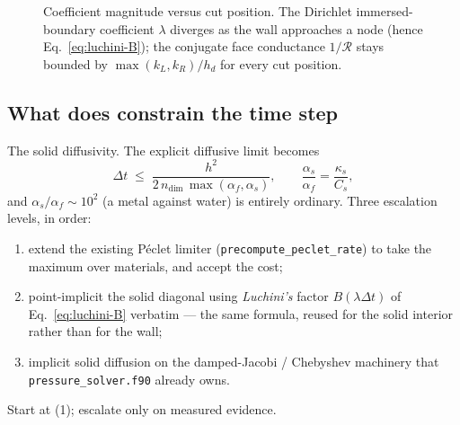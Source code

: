 \documentclass[11pt,a4paper]{article}
\newcommand{\Rser}{\mathcal{R}}
\newcommand{\code}[1]{\texttt{#1}}
\begin{document}
\begin{figure}[htbp]
\centering
{}
\caption{Coefficient magnitude versus cut position. The Dirichlet
immersed-boundary coefficient $\lambda$ diverges as the wall approaches a node
(hence Eq.~\eqref{eq:luchini-B}); the conjugate face conductance $1/\Rser$ stays
bounded by $\max(k_L,k_R)/h_d$ for every cut position.}
\label{fig:stiffness}
\end{figure}

\subsection{What does constrain the time step}

The solid diffusivity. The explicit diffusive limit becomes
\begin{equation}
  \Delta t \;\le\; \frac{h^{2}}{2\,n_{\text{dim}}\,\max(\alpha_f,\alpha_s)},
  \qquad \frac{\alpha_s}{\alpha_f}=\frac{\kappa_s}{C_s},
\end{equation}
and $\alpha_s/\alpha_f\sim10^{2}$ (a metal against water) is entirely ordinary.
Three escalation levels, in order:
\begin{enumerate}
\item extend the existing P\'eclet limiter
      (\code{precompute\_peclet\_rate}) to take the maximum over materials, and
      accept the cost;
\item point-implicit the solid diagonal using \emph{Luchini's} factor
      $B(\lambda\Delta t)$ of Eq.~\eqref{eq:luchini-B} verbatim --- the same
      formula, reused for the solid interior rather than for the wall;
\item implicit solid diffusion on the damped-Jacobi / Chebyshev machinery that
      \code{pressure\_solver.f90} already owns.
\end{enumerate}
Start at (1); escalate only on measured evidence.
\end{document}
